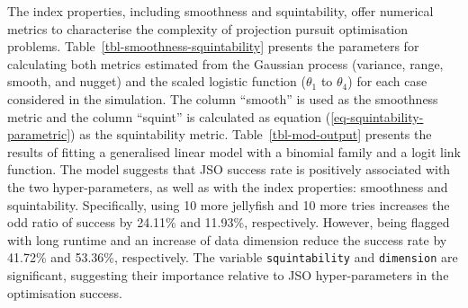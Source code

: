 \documentclass[
  12pt,
]{interact}
\theoremstyle{plain}
\begin{document}
The index properties, including smoothness and squintability, offer
numerical metrics to characterise the complexity of projection pursuit
optimisation problems. Table~\ref{tbl-smoothness-squintability} presents
the parameters for calculating both metrics estimated from the Gaussian
process (variance, range, smooth, and nugget) and the scaled logistic
function (\(\theta_1\) to \(\theta_4\)) for each case considered in the
simulation. The column ``smooth'' is used as the smoothness metric and
the column ``squint'' is calculated as equation
(\ref{eq-squintability-parametric}) as the squintability metric.
Table~\ref{tbl-mod-output} presents the results of fitting a generalised
linear model with a binomial family and a logit link function. The model
suggests that JSO success rate is positively associated with the two
hyper-parameters, as well as with the index properties: smoothness and
squintability. Specifically, using 10 more jellyfish and 10 more tries
increases the odd ratio of success by 24.11\% and 11.93\%, respectively.
However, being flagged with long runtime and an increase of data
dimension reduce the success rate by 41.72\% and 53.36\%, respectively.
The variable \texttt{squintability} and \texttt{dimension} are
significant, suggesting their importance relative to JSO
hyper-parameters in the optimisation success.
\end{document}
